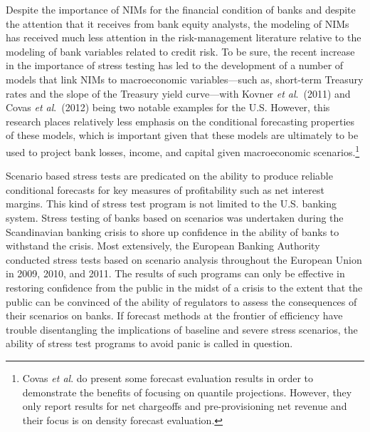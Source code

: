 \documentclass[11pt]{article}
\renewcommand{\baselinestretch}{1.5}
\begin{document}
Despite the importance of NIMs for the financial condition of banks and despite the attention that it receives from bank equity analysts, the modeling of NIMs has received much less attention in the risk-management literature relative to the modeling of bank variables related to credit risk.  To be sure, the recent increase in the importance of stress testing has led to the development of a number of models that link NIMs to macroeconomic variables---such as, short-term Treasury rates and the slope of the Treasury yield curve---with Kovner \textit{et al}.~(2011) and Covas \textit{et al}.~(2012) being two notable examples for the U.S.  However, this research places relatively less emphasis on the conditional forecasting properties of these models, which is important given that these models are ultimately to be used to project bank losses, income, and capital given macroeconomic scenarios.\renewcommand{\baselinestretch}{1}\footnote{Covas \textit{et al}. do present some forecast evaluation results in order to demonstrate the benefits of focusing on quantile projections. However, they only report results for net chargeoffs and pre-provisioning net revenue and their focus is on density forecast evaluation.\vspace{0.05in}}\renewcommand{\baselinestretch}{1.5}

Scenario based stress tests are predicated on the ability to produce reliable conditional forecasts for key measures of profitability such as net interest margins. This kind of stress test program is not limited to the U.S. banking system. Stress testing of banks based on scenarios was undertaken during the Scandinavian banking crisis to shore up confidence in the ability of banks to withstand the crisis. Most extensively, the European Banking Authority conducted stress tests based on scenario analysis throughout the European Union in 2009, 2010, and 2011. The results of such programs can only be effective in restoring confidence from the public in the midst of a crisis to the extent that the public can be convinced of the ability of regulators to assess the consequences of their scenarios on banks. If forecast methods at the frontier of efficiency have trouble disentangling the implications of baseline and severe stress scenarios, the ability of stress test programs to avoid panic is called in question.

\end{document}
